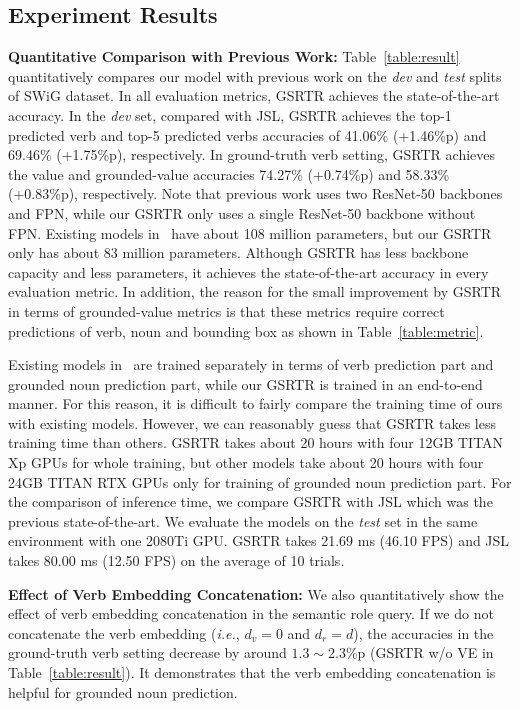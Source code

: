\subsection{Experiment Results}
\textbf{Quantitative Comparison with Previous Work:}
Table~\ref{table:result} quantitatively compares our model with previous work on the \emph{dev} and \emph{test} splits of SWiG dataset.
In all evaluation metrics, GSRTR achieves the state-of-the-art accuracy.
In the \emph{dev} set, compared with JSL, GSRTR achieves the top-1 predicted verb and top-5 predicted verbs accuracies of 41.06\% (+1.46\%p) and 69.46\% (+1.75\%p), respectively.
In ground-truth verb setting, GSRTR achieves the value and grounded-value accuracies 74.27\% (+0.74\%p) and 58.33\% (+0.83\%p), respectively.
Note that previous work uses two ResNet-50 backbones and FPN, while our GSRTR only uses a single ResNet-50 backbone without FPN. 
Existing models in~\cite{pratt2020grounded} have about 108 million parameters, but our GSRTR only has about 83 million parameters.
Although GSRTR has less backbone capacity and less parameters, it achieves the state-of-the-art accuracy in every evaluation metric. In addition, the reason for the small improvement by GSRTR in terms of grounded-value metrics is that these metrics require correct predictions of verb, noun and bounding box as shown in Table~\ref{table:metric}.

Existing models in~\cite{pratt2020grounded} are trained separately in terms of verb prediction part and grounded noun prediction part, while our GSRTR is trained in an end-to-end manner.
For this reason, it is difficult to fairly compare the training time of ours with existing models.
However, we can reasonably guess that GSRTR takes less training time than others.
GSRTR takes about 20 hours with four 12GB TITAN Xp GPUs for whole training, but other models take about 20 hours with four 24GB TITAN RTX GPUs only for training of grounded noun prediction part.
For the comparison of inference time, we compare GSRTR with JSL which was the previous state-of-the-art.
We evaluate the models on the \emph{test} set in the same environment with one 2080Ti GPU.
GSRTR takes 21.69 ms (46.10 FPS) and JSL takes 80.00 ms (12.50 FPS) on the average of 10 trials.
\label{exp:result}

\noindent
\textbf{Effect of Verb Embedding Concatenation:}
We also quantitatively show the effect of verb embedding concatenation in the semantic role query.
If we do not concatenate the verb embedding (\emph{i.e.}, $d_v=0$ and $d_r=d$), the accuracies in the ground-truth verb setting decrease by around $1.3 \sim 2.3$\%p  (GSRTR w/o VE in Table~\ref{table:result}).
It demonstrates that the verb embedding concatenation is helpful for grounded noun prediction.

